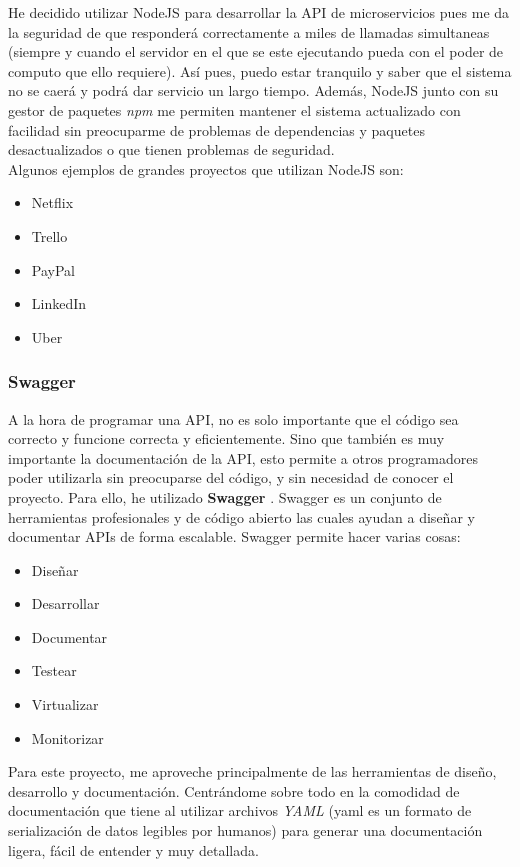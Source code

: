 He decidido utilizar NodeJS para desarrollar la API de microservicios pues me da la seguridad de que responderá correctamente a miles de llamadas simultaneas (siempre y cuando el servidor en el que se este ejecutando pueda con el poder de computo que ello requiere). Así pues, puedo estar tranquilo y saber que el sistema no se caerá y podrá dar servicio un largo tiempo. Además, NodeJS junto con su gestor de paquetes \emph{npm} me permiten mantener el sistema actualizado con facilidad sin preocuparme de problemas de dependencias y paquetes desactualizados o que tienen problemas de seguridad. \\

Algunos ejemplos de grandes proyectos que utilizan NodeJS son:
\begin{itemize}
\item Netflix
\item Trello
\item PayPal
\item LinkedIn
\item Uber
\end{itemize}

\subsubsection{Swagger}
A la hora de programar una API, no es solo importante que el código sea correcto y funcione correcta y eficientemente. Sino que también es muy importante la documentación de la API, esto permite a otros programadores poder utilizarla sin preocuparse del código, y sin necesidad de conocer el proyecto. Para ello, he utilizado \textbf{Swagger} \cite{swagger}. Swagger es un conjunto de herramientas profesionales y de código abierto las cuales ayudan a diseñar y documentar APIs de forma escalable. Swagger permite hacer varias cosas:
\begin{itemize}
\item Diseñar
\item Desarrollar
\item Documentar
\item Testear
\item Virtualizar
\item Monitorizar
\end{itemize}

Para este proyecto, me aproveche principalmente de las herramientas de diseño, desarrollo y documentación. Centrándome sobre todo en la comodidad de documentación que tiene al utilizar archivos \emph{YAML} (yaml es un formato de serialización de datos legibles por humanos) para generar una documentación ligera, fácil de entender y muy detallada. 

